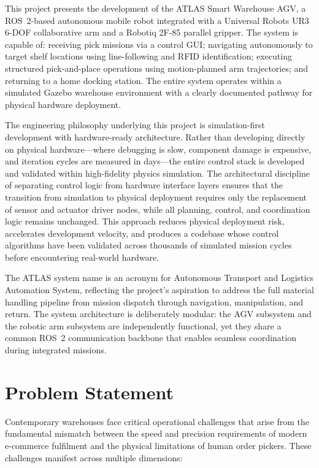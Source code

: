 \documentclass[12pt,a4paper,oneside]{report}
\begin{document}
This project presents the development of the ATLAS Smart Warehouse AGV, a ROS~2-based autonomous mobile robot integrated with a Universal Robots UR3 6-DOF collaborative arm and a Robotiq 2F-85 parallel gripper. The system is capable of: receiving pick missions via a control GUI; navigating autonomously to target shelf locations using line-following and RFID identification; executing structured pick-and-place operations using motion-planned arm trajectories; and returning to a home docking station. The entire system operates within a simulated Gazebo warehouse environment with a clearly documented pathway for physical hardware deployment.

The engineering philosophy underlying this project is simulation-first development with hardware-ready architecture. Rather than developing directly on physical hardware---where debugging is slow, component damage is expensive, and iteration cycles are measured in days---the entire control stack is developed and validated within high-fidelity physics simulation. The architectural discipline of separating control logic from hardware interface layers ensures that the transition from simulation to physical deployment requires only the replacement of sensor and actuator driver nodes, while all planning, control, and coordination logic remains unchanged. This approach reduces physical deployment risk, accelerates development velocity, and produces a codebase whose control algorithms have been validated across thousands of simulated mission cycles before encountering real-world hardware.

The ATLAS system name is an acronym for Autonomous Transport and Logistics Automation System, reflecting the project's aspiration to address the full material handling pipeline from mission dispatch through navigation, manipulation, and return. The system architecture is deliberately modular: the AGV subsystem and the robotic arm subsystem are independently functional, yet they share a common ROS~2 communication backbone that enables seamless coordination during integrated missions.

\section{Problem Statement}

Contemporary warehouses face critical operational challenges that arise from the fundamental mismatch between the speed and precision requirements of modern e-commerce fulfilment and the physical limitations of human order pickers. These challenges manifest across multiple dimensions:
\end{document}
